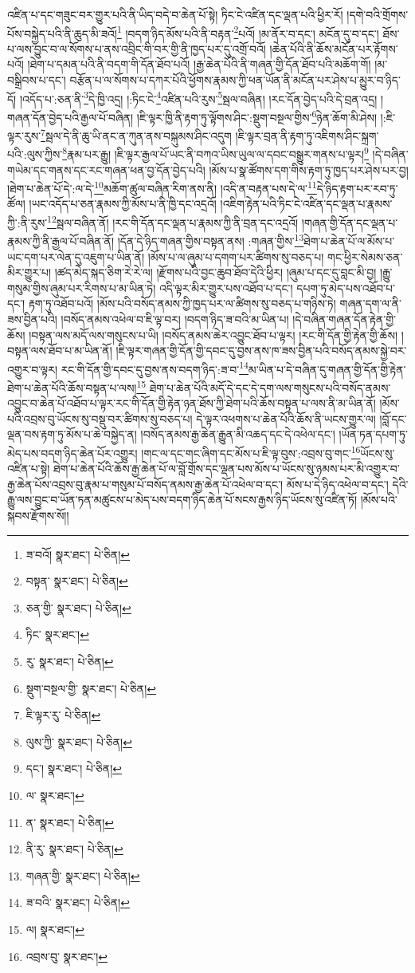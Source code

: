 འཛིན་པ་དང་གཟུང་བར་གྱུར་པའི་ནི་ཡིད་བདེ་བ་ཆེན་པོ་སྟེ། ཏིང་ངེ་འཛིན་དང་ལྡན་པའི་ཕྱིར་རོ། །དགེ་བའི་གྲོགས་པོས་བསྐྱེད་པའི་ནི་ཆུད་མི་ཟའོ།\footnote{ཟ་བའོ།  སྣར་ཐང་།  པེ་ཅིན། } །བདག་ཉིད་མོས་པའི་ནི་བརྟན་\footnote{བསྟན་  སྣར་ཐང་།  པེ་ཅིན། }པའོ། །མ་ནོར་བ་དང་། མངོན་དུ་བ་དང་། ཐོས་པ་ལས་བྱུང་བ་ལ་སོགས་པ་ནས་འབྲིང་གི་བར་གྱི་ནི་ཁྱད་པར་དུ་འགྲོ་བའོ། །ཆེན་པོའི་ནི་ཆོས་མངོན་པར་རྟོགས་པའོ། །ཐེག་པ་དམན་པའི་ནི་བདག་གི་དོན་ཐོབ་པའོ། །རྒྱ་ཆེན་པོའི་ནི་གཞན་གྱི་དོན་ཐོབ་པའི་མཆོག་གོ། །མ་བསྒྲིབས་པ་དང་། བརྩོན་པ་ལ་སོགས་པ་དཀར་པོའི་ཕྱོགས་རྣམས་ཀྱི་ཕན་ཡོན་ནི་མངོན་པར་ཤེས་པ་མྱུར་བ་ཉིད་དོ། །འདོད་པ་:ཅན་ནི་\footnote{ཅན་གྱི་  སྣར་ཐང་།  པེ་ཅིན། }དེ་ཁྱི་འདྲ། །:ཏིང་ངེ་\footnote{ཏིང་  སྣར་ཐང་། }འཛིན་པའི་རུས་\footnote{རུ་  སྣར་ཐང་།  པེ་ཅིན། }སྦལ་བཞིན། །རང་དོན་བྱེད་པའི་དེ་བྲན་འདྲ། །གཞན་དོན་བྱེད་པའི་རྒྱལ་པོ་བཞིན། །ཇི་ལྟར་ཁྱི་ནི་རྟག་ཏུ་ལྟོགས་ཤིང་:སྡུག་བསྔལ་གྱིས་\footnote{སྡུག་བསྔལ་གྱི་  སྣར་ཐང་།  པེ་ཅིན། }ཉེན་ཆོག་མི་ཤེས། །:ཇི་ལྟར་རུས་\footnote{ཇི་ལྟར་རུ་  པེ་ཅིན། }སྦལ་དེ་ནི་ཆུ་ཡི་ནང་ན་ཀུན་ནས་བསྐུམས་ཤིང་འདུག །ཇི་ལྟར་བྲན་ནི་རྟག་ཏུ་འཇིགས་ཤིང་སྐྲག་པའི་:ལུས་ཀྱིས་\footnote{ལུས་ཀྱི་  སྣར་ཐང་།  པེ་ཅིན། }རྣམ་པར་རྒྱུ། །ཇི་ལྟར་རྒྱལ་པོ་ཡང་ནི་བཀའ་ཡིས་ཡུལ་ལ་དབང་བསྒྱུར་གནས་པ་ལྟར།\footnote{དང་།  སྣར་ཐང་།  པེ་ཅིན། } །དེ་བཞིན་གཡེམ་དང་གནས་དང་རང་གཞན་ཕན་བྱ་དོན་བྱེད་པའི། །མོས་པ་སྣ་ཚོགས་དག་གིས་རྟག་ཏུ་ཁྱད་པར་ཤེས་པར་བྱ། །ཐེག་པ་ཆེན་པོ་དེ་:ལ་དེ་\footnote{ལ་  སྣར་ཐང་། }མཆོག་ཚུལ་བཞིན་རིག་ནས་ནི། །འདི་ན་བརྟན་པས་དེ་ལ་\footnote{ན་  སྣར་ཐང་།  པེ་ཅིན། }དེ་ཉིད་རྟག་པར་རབ་ཏུ་ཚོལ། །ཡང་འདོད་པ་ཅན་རྣམས་ཀྱི་མོས་པ་ནི་ཁྱི་དང་འདྲའོ། །འཇིག་རྟེན་པའི་ཏིང་ངེ་འཛིན་དང་ལྡན་པ་རྣམས་ཀྱི་:ནི་རུས་\footnote{ནི་རུ་  སྣར་ཐང་།  པེ་ཅིན། }སྦལ་བཞིན་ནོ། །རང་གི་དོན་དང་ལྡན་པ་རྣམས་ཀྱི་ནི་བྲན་དང་འདྲའོ། །གཞན་གྱི་དོན་དང་ལྡན་པ་རྣམས་ཀྱི་ནི་རྒྱལ་པོ་བཞིན་ནོ། །དོན་དེ་ཉིད་གཞན་གྱིས་བསྟན་ནས། :གཞན་གྱིས་\footnote{གཞན་གྱི་  སྣར་ཐང་།  པེ་ཅིན། }ཐེག་པ་ཆེན་པོ་ལ་མོས་པ་ཡང་དག་པར་ལེན་དུ་འཇུག་པ་ཡིན་ནོ། །མོས་པ་ལ་ཞུམ་པ་དགག་པར་ཚིགས་སུ་བཅད་པ། གང་ཕྱིར་སེམས་ཅན་མིར་གྱུར་པ། །ཚད་མེད་སྐད་ཅིག་རེ་རེ་ལ། །རྫོགས་པའི་བྱང་ཆུབ་ཐོབ་དེའི་ཕྱིར། །ཞུམ་པ་དང་དུ་བླང་མི་བྱ། །རྒྱུ་གསུམ་གྱིས་ཞུམ་པར་རིགས་པ་མ་ཡིན་ཏེ། འདི་ལྟར་མིར་གྱུར་པས་འཐོབ་པ་དང་། དཔག་ཏུ་མེད་པས་འཐོབ་པ་དང་། རྟག་ཏུ་འཐོབ་པའོ། །མོས་པའི་བསོད་ནམས་ཀྱི་ཁྱད་པར་ལ་ཚིགས་སུ་བཅད་པ་གཉིས་ཏེ། གཞན་དག་ལ་ནི་ཟས་བྱིན་པའི། །བསོད་ནམས་འཕེལ་བ་ཇི་ལྟ་བར། །བདག་ཉིད་ཟ་བའི་མ་ཡིན་པ། །དེ་བཞིན་གཞན་དོན་རྟེན་གྱི་ཆོས། །བསྟན་ལས་མདོ་ལས་གསུངས་པ་ཡི། །བསོད་ནམས་ཆེར་འབྱུང་ཐོབ་པ་ལྟར། །རང་གི་དོན་གྱི་རྟེན་གྱི་ཆོས། །བསྟན་ལས་ཐོབ་པ་མ་ཡིན་ནོ། །ཇི་ལྟར་གཞན་གྱི་དོན་གྱི་དབང་དུ་བྱས་ནས་ཁ་ཟས་བྱིན་པའི་བསོད་ནམས་སྐྱེ་བར་འགྱུར་བ་ལྟར། རང་གི་དོན་གྱི་དབང་དུ་བྱས་ནས་བདག་ཉིད་:ཟ་བ་\footnote{ཟ་བའི་  སྣར་ཐང་།  པེ་ཅིན། }མ་ཡིན་པ་དེ་བཞིན་དུ་གཞན་གྱི་དོན་གྱི་རྟེན་ཐེག་པ་ཆེན་པོའི་ཆོས་བསྟན་པ་ལས།\footnote{ལ།  སྣར་ཐང་། } ཐེག་པ་ཆེན་པོའི་མདོ་དེ་དང་དེ་དག་ལས་གསུངས་པའི་བསོད་ནམས་འབྱུང་བ་ཆེན་པོ་འཐོབ་པ་ལྟར་རང་གི་དོན་གྱི་རྟེན་ཉན་ཐོས་ཀྱི་ཐེག་པའི་ཆོས་བསྟན་པ་ལས་ནི་མ་ཡིན་ནོ། །མོས་པའི་འབྲས་བུ་ཡོངས་སུ་བསྡུ་བར་ཚིགས་སུ་བཅད་པ། དེ་ལྟར་འཕགས་པ་ཆེན་པོའི་ཆོས་ནི་ཡངས་གྱུར་ལ། །བློ་དང་ལྡན་བས་རྟག་ཏུ་མོས་པ་ཆེ་བསྐྱེད་ན། །བསོད་ནམས་རྒྱ་ཆེན་རྒྱུན་མི་འཆད་དང་དེ་འཕེལ་དང་། །ཡོན་ཏན་དཔག་ཏུ་མེད་པས་བདག་ཉིད་ཆེན་པོར་འགྱུར། །གང་ལ་དང་གང་ཞིག་དང་མོས་པ་ཇི་ལྟ་བུས་:འབྲས་བུ་གང་\footnote{འབྲས་བུ་  སྣར་ཐང་། }ཡོངས་སུ་འཛིན་པ་སྟེ། ཐེག་པ་ཆེན་པོའི་ཆོས་རྒྱ་ཆེན་པོ་ལ་བློ་གྲོས་དང་ལྡན་པས་མོས་པ་ཡོངས་སུ་ཉམས་པར་མི་འགྱུར་བ་རྒྱ་ཆེན་པོས་འབྲས་བུ་རྣམ་པ་གསུམ་པོ་བསོད་ནམས་རྒྱ་ཆེན་པོ་འཕེལ་བ་དང་། མོས་པ་དེ་ཉིད་འཕེལ་བ་དང་། དེའི་རྒྱུ་ལས་བྱུང་བ་ཡོན་ཏན་མཚུངས་པ་མེད་པས་བདག་ཉིད་ཆེན་པོ་སངས་རྒྱས་ཉིད་ཡོངས་སུ་འཛིན་ཏོ། །མོས་པའི་སྐབས་རྫོགས་སོ།། 
